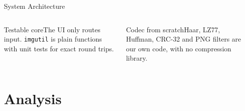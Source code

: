 \begin{frame}{System Architecture}
\begin{columns}[T,onlytextwidth]
\begin{card}{Testable core}The UI only routes input. \texttt{imgutil} is plain functions with unit tests for exact round trips.\end{card}
\begin{card}{Codec from scratch}Haar, LZ77, Huffman, CRC-32 and PNG filters are our own code, with no compression library.\end{card}
\end{columns}
\vspace{2mm}
\end{frame}

\section{Analysis}


